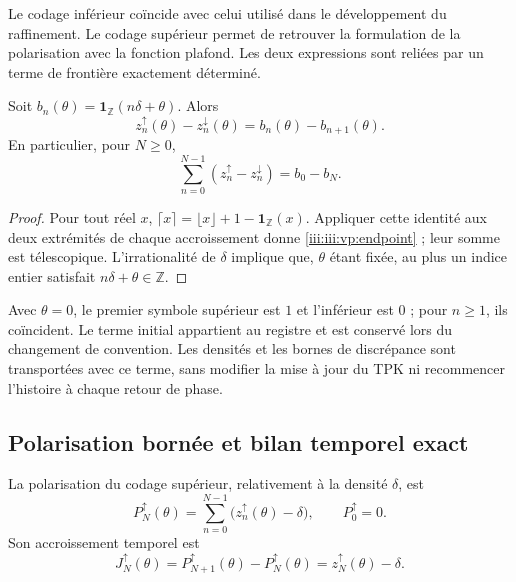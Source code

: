 Le codage inférieur coïncide avec celui utilisé dans le développement
du raffinement. Le codage supérieur permet de retrouver la formulation de la
polarisation avec la fonction plafond. Les deux expressions sont reliées par
un terme de frontière exactement déterminé.

\begin{proposition}
Soit $b_n(\theta)=\mathbf1_{\mathbb Z}(n\delta+\theta)$. Alors
\begin{equation}
 z_n^{\uparrow}(\theta)-z_n^{\downarrow}(\theta)
 =b_n(\theta)-b_{n+1}(\theta).
 \label{iii:iii:vp:endpoint}
\end{equation}
En particulier, pour $N\geq0$,
\[
 \sum_{n=0}^{N-1}(z_n^{\uparrow}-z_n^{\downarrow})
 =b_0-b_N.
\]
\end{proposition}
\begin{proof}
Pour tout réel $x$, $\lceil x\rceil=\lfloor x\rfloor+1-
\mathbf1_{\mathbb Z}(x)$. Appliquer cette identité aux deux extrémités
de chaque accroissement donne \eqref{iii:iii:vp:endpoint} ; leur somme est télescopique.
L’irrationalité de $\delta$ implique que, $\theta$ étant fixée, au plus
un indice entier satisfait $n\delta+\theta\in\mathbb Z$.
\end{proof}

Avec $\theta=0$, le premier symbole supérieur est $1$ et l'inférieur est $0$ ; pour $n\geq1$, ils coïncident. Le terme initial appartient au registre et est conservé lors du changement de convention. Les densités et les bornes de discrépance sont transportées avec ce terme, sans modifier la mise à jour du TPK ni recommencer l'histoire à chaque retour de phase.

\subsection{Polarisation bornée et bilan temporel exact}

\begin{definition}
La polarisation du codage supérieur, relativement à la densité
$\delta$, est
\begin{equation}
 P_N^{\uparrow}(\theta)
 =\sum_{n=0}^{N-1}\bigl(z_n^{\uparrow}(\theta)-\delta\bigr),
 \qquad P_0^{\uparrow}=0.
 \label{iii:iii:vp:polarization}
\end{equation}
Son accroissement temporel est
\begin{equation}
 J_N^{\uparrow}(\theta)
 =P_{N+1}^{\uparrow}(\theta)-P_N^{\uparrow}(\theta)
 =z_N^{\uparrow}(\theta)-\delta.
 \label{iii:iii:vp:current}
\end{equation}
\end{definition}

